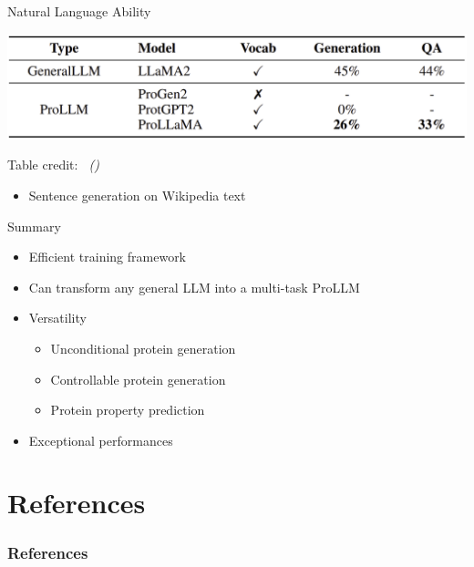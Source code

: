 \documentclass[dvipsnames,
hyperref={citecolor=black}
]{beamer}
\newcommand{\credit}[2]{{\par\hfill \tiny #1 credit:~\itshape\citeauthor{#2} (\citeyear{#2})}}
\begin{document}
\begin{frame}{Natural Language Ability}
	\begin{center}
		\includegraphics[scale=0.21]{tables/natural_language_ability_comparison.png}
	\end{center}
	\credit{Table}{lv2024prollama}
	\begin{itemize}
		\item Sentence generation on Wikipedia text
	\end{itemize}
\end{frame}

\begin{frame}{Summary}
	\begin{itemize}
		\item Efficient training framework
		\item Can transform any general LLM into a multi-task ProLLM
		\item Versatility
		\begin{itemize}
			\item Unconditional protein generation
			\item Controllable protein generation
			\item Protein property prediction
		\end{itemize}
		\item Exceptional performances
	\end{itemize}
\end{frame}

\section{References}
\begin{frame}[allowframebreaks]
\frametitle{References}
\printbibliography
\end{frame}
\end{document}

